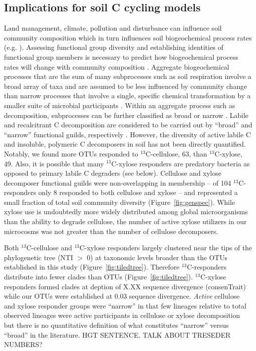 \subsection{Implications for soil C cycling models}
Land management, climate, pollution and disturbance can influence soil
community composition \citep{McGuire2010} which in turn influences soil
biogeochemical process rates (e.g. \citep{Berlemont2014a}). Assessing
functional group diversity and establishing identities of functional group
members is necessary to predict how biogeochemical process rates will change
with community composition \citep{Schimel_1995,McGuire2010}. Aggregate
biogeochemical processes that are the sum of many subprocesses such
as soil respiration involve a broad array of taxa and are assumed to be less
influenced by community change than narrow processes that involve a single,
specific chemical transformation by a smaller suite of microbial participants
\citep{Schimel_1995}. Within an aggregate process such as decomposition,
subprocesses can be further classified as broad or narrow 
\citep{McGuire2010}. Labile and recalcitrant C decomposition are considered to
be carried out by ``broad'' and ``narrow'' functional guilds, respectively
\citep{McGuire2010}. However, the diversity of active labile C and insoluble,
polymeric C decomposers in soil has not been directly quantified. Notably, we
found more OTUs responded to $^{13}$C-cellulose, 63, than $^{13}$C-xylose, 49.
Also, it is possible that many $^{13}$C-xylose responders are predatory
bacteria as opposed to primary labile C degraders (see below). Cellulose and
xylose decomposer functional guilds were non-overlapping in membership -- of
104 $^{13}$C-responders only 8 responded to both cellulose and xylose -- and
represented a small fraction of total soil community diversity
(Figure~\ref{fig:genspec}). While xylose use is undoubtedly more widely
distributed among global microorganisms than the ability to degrade cellulose,
the number of active xylose utilizers in our microcosms was not greater than
the number of cellulose decomposers.

Both $^{13}$C-cellulose and $^{13}$C-xylose responders largely clustered
near the tips of the phylogenetic tree (NTI $>$ 0) at taxonomic levels broader
than the OTUs established in this study (Figure~\ref{fig:tiledtree}). Therefore
$^{13}$C-responders distribute into fewer clades than OTUs
(Figure~\ref{fig:tiledtree}). $^{13}$C-xylose responders formed clades at
deption of X.XX sequence divergence (consenTrait) while our OTUs were
established at 0.03 sequence divergence. \textit{Active} cellulose and
xylose responder groups were ``narrow'' in that few lineages relative to total
observed lineages were active participants in cellulose or xylose decomposition
but there is no quantitative definition of what constitutes ``narrow'' versus
``broad'' in the literature. HGT SENTENCE. TALK ABOUT TRESEDER NUMBERS?

